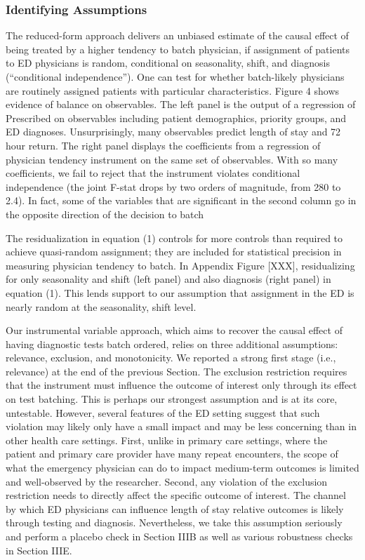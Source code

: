 \documentclass[,,nonblindrev]{informs}
\begin{document}
\hypertarget{identifying-assumptions}{%
\subsubsection{Identifying Assumptions}\label{identifying-assumptions}}

The reduced-form approach delivers an unbiased estimate of the causal
effect of being treated by a higher tendency to batch physician, if
assignment of patients to ED physicians is random, conditional on
seasonality, shift, and diagnosis (``conditional independence''). One
can test for whether batch-likely physicians are routinely assigned
patients with particular characteristics. Figure 4 shows evidence of
balance on observables. The left panel is the output of a regression of
Prescribed on observables including patient demographics, priority
groups, and ED diagnoses. Unsurprisingly, many observables predict
length of stay and 72 hour return. The right panel displays the
coefficients from a regression of physician tendency instrument on the
same set of observables. With so many coefficients, we fail to reject
that the instrument violates conditional independence (the joint F-stat
drops by two orders of magnitude, from 280 to 2.4). In fact, some of the
variables that are significant in the second column go in the opposite
direction of the decision to batch

The residualization in equation (1) controls for more controls than
required to achieve quasi-random assignment; they are included for
statistical precision in measuring physician tendency to batch. In
Appendix Figure {[}XXX{]}, residualizing for only seasonality and shift
(left panel) and also diagnosis (right panel) in equation (1). This
lends support to our assumption that assignment in the ED is nearly
random at the seasonality, shift level.

Our instrumental variable approach, which aims to recover the causal
effect of having diagnostic tests batch ordered, relies on three
additional assumptions: relevance, exclusion, and monotonicity. We
reported a strong first stage (i.e., relevance) at the end of the
previous Section. The exclusion restriction requires that the instrument
must influence the outcome of interest only through its effect on test
batching. This is perhaps our strongest assumption and is at its core,
untestable. However, several features of the ED setting suggest that
such violation may likely only have a small impact and may be less
concerning than in other health care settings. First, unlike in primary
care settings, where the patient and primary care provider have many
repeat encounters, the scope of what the emergency physician can do to
impact medium-term outcomes is limited and well-observed by the
researcher. Second, any violation of the exclusion restriction needs to
directly affect the specific outcome of interest. The channel by which
ED physicians can influence length of stay relative outcomes is likely
through testing and diagnosis. Nevertheless, we take this assumption
seriously and perform a placebo check in Section IIIB as well as various
robustness checks in Section IIIE.
\end{document}
